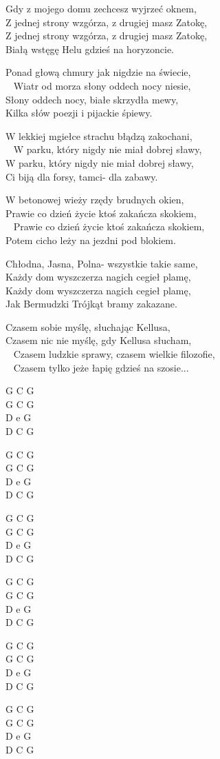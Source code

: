 \begin{text}
Gdy z mojego domu zechcesz wyjrzeć oknem,\\
Z jednej strony wzgórza, z drugiej masz Zatokę,\\
Z jednej strony wzgórza, z drugiej masz Zatokę,\\
Białą wstęgę Helu gdzieś na horyzoncie. 

Ponad głową chmury jak nigdzie na świecie,\\ 
Wiatr od morza słony oddech nocy niesie,\\
Słony oddech nocy, białe skrzydła mewy, \\
Kilka słów poezji i pijackie śpiewy.

W lekkiej mgiełce strachu błądzą zakochani,\\ 
W parku, który nigdy nie miał dobrej sławy, \\
W parku, który nigdy nie miał dobrej sławy,\\
Ci biją dla forsy, tamci- dla zabawy. 

W betonowej wieży rzędy brudnych okien, \\
Prawie co dzień życie ktoś zakańcza skokiem,\\ 
Prawie co dzień życie ktoś zakańcza skokiem,\\
Potem cicho leży na jezdni pod blokiem. 

Chłodna, Jasna, Polna- wszystkie takie same,\\
Każdy dom wyszczerza nagich cegieł plamę,\\
Każdy dom wyszczerza nagich cegieł plamę,\\
Jak Bermudzki Trójkąt bramy zakazane. 

Czasem sobie myślę, słuchając Kellusa,\\
Czasem nic nie myślę, gdy Kellusa słucham,\\ 
Czasem ludzkie sprawy, czasem wielkie filozofie,\\ 
Czasem tylko jeże łapię gdzieś na szosie...
\end{text}
\begin{chord}
    G C G\\
    G C G\\
    D e G\\
    D C G

G C G\\
G C G\\
D e G\\
D C G

G C G\\
G C G\\
D e G\\
D C G

G C G\\
G C G\\
D e G\\
D C G

G C G\\
G C G\\
D e G\\
D C G

G C G\\
G C G\\
D e G\\
D C G
\end{chord}